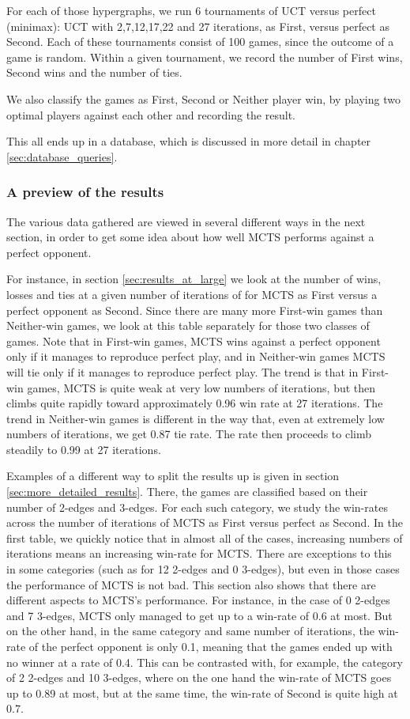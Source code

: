 For each of those hypergraphs, we run 6 tournaments of UCT versus perfect (minimax): UCT with 2,7,12,17,22 and 27 iterations, as First, versus perfect as Second.
Each of these tournaments consist of 100 games, since the outcome of a game is random. Within a given tournament, we record the number of First wins, Second wins and the number of ties.

We also classify the games as First, Second or Neither player win, by playing two optimal players against each other and recording the result.

This all ends up in a database, which is discussed in more detail in chapter \ref{sec:database_queries}.

\subsubsection{A preview of the results}

The various data gathered are viewed in several different ways in the next section, in order to get some idea about how well MCTS performs against a perfect opponent.

For instance, in section \ref{sec:results_at_large} we look at the number of wins, losses and ties at a given number of iterations of for MCTS as First versus a perfect opponent as Second. Since there are many more First-win games than Neither-win games, we look at this table separately for those two classes of games. Note that in First-win games, MCTS wins against a perfect opponent only if it manages to reproduce perfect play, and in Neither-win games MCTS will tie only if it manages to reproduce perfect play. The trend is that in First-win games, MCTS is quite weak at very low numbers of iterations, but then climbs quite rapidly toward approximately 0.96 win rate at 27 iterations. The trend in Neither-win games is different in the way that, even at extremely low numbers of iterations, we get 0.87 tie rate. The rate then proceeds to climb steadily to 0.99 at 27 iterations.

Examples of a different way to split the results up is given in section \ref{sec:more_detailed_results}.
There, the games are classified based on their number of 2-edges and 3-edges. For each such category, we study the win-rates across the number of iterations of MCTS as First versus perfect as Second.
In the first table, we quickly notice that in almost all of the cases, increasing numbers of iterations means an increasing win-rate for MCTS. There are exceptions to this in some categories (such as for 12 2-edges and 0 3-edges), but even in those cases the performance of MCTS is not bad.
This section also shows that there are different aspects to MCTS's performance. For instance, in the case of 0 2-edges and 7 3-edges, MCTS only managed to get up to a win-rate of 0.6 at most. But on the other hand, in the same category and same number of iterations, the win-rate of the perfect opponent is only 0.1, meaning that the games ended up with no winner at a rate of 0.4. This can be contrasted with, for example, the category of 2 2-edges and 10 3-edges, where on the one hand the win-rate of MCTS goes up to 0.89 at most, but at the same time, the win-rate of Second is quite high at 0.7.
